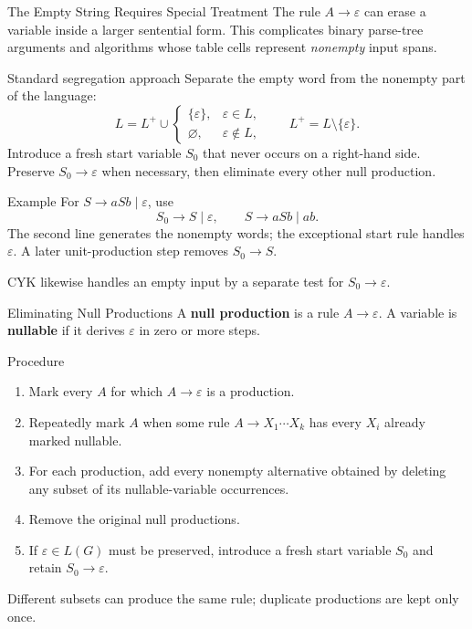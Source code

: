 \documentclass[10pt]{beamer}
\begin{document}
\begin{frame}{The Empty String Requires Special Treatment}
  \small
  The rule $A\to\varepsilon$ can erase a variable inside a larger sentential
  form. This complicates binary parse-tree arguments and algorithms whose
  table cells represent \emph{nonempty} input spans.
  \pause
  \begin{block}{Standard segregation approach}
    Separate the empty word from the nonempty part of the language:
    \[
      L=L^+\cup
      \begin{cases}
        \{\varepsilon\},&\varepsilon\in L,\\
        \varnothing,&\varepsilon\notin L,
      \end{cases}
      \qquad L^+=L\setminus\{\varepsilon\}.
    \]
    Introduce a fresh start variable $S_0$ that never occurs on a right-hand
    side. Preserve $S_0\to\varepsilon$ when necessary, then eliminate every
    other null production.
  \end{block}
  \pause
  \begin{exampleblock}{Example}
    For $S\to aSb\mid\varepsilon$, use
    \[
      S_0\to S\mid\varepsilon,
      \qquad
      S\to aSb\mid ab.
    \]
    The second line generates the nonempty words; the exceptional start rule
    handles $\varepsilon$. A later unit-production step removes $S_0\to S$.
  \end{exampleblock}
  CYK likewise handles an empty input by a separate test for
  $S_0\to\varepsilon$.
\end{frame}

\begin{frame}{Eliminating Null Productions}
  \small
  A \textbf{null production} is a rule $A\to\varepsilon$. A variable is
  \textbf{nullable} if it derives $\varepsilon$ in zero or more steps.
  \pause
  \begin{block}{Procedure}
    \begin{enumerate}
      \item Mark every $A$ for which $A\to\varepsilon$ is a production.
      \item Repeatedly mark $A$ when some rule
        $A\to X_1\cdots X_k$ has every $X_i$ already marked nullable.
      \item For each production, add every nonempty alternative obtained by
        deleting any subset of its nullable-variable occurrences.
      \item Remove the original null productions.
      \item If $\varepsilon\in L(G)$ must be preserved, introduce a fresh
        start variable $S_0$ and retain $S_0\to\varepsilon$.
    \end{enumerate}
  \end{block}
  Different subsets can produce the same rule; duplicate productions are kept
  only once.
\end{frame}
\end{document}
